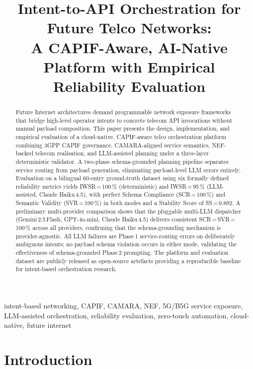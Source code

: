\documentclass[conference]{IEEEtran}
\title{Intent-to-API Orchestration for Future Telco Networks:\\
A CAPIF-Aware, AI-Native Platform with Empirical\\
Reliability Evaluation}
\author{
\IEEEauthorblockN{T\"{u}rkan Do\u{g}a Durak}
\IEEEauthorblockA{
Centre Tecnol\`{o}gic de Telecomunicacions de Catalunya (CTTC)\\
Castelldefels, Spain\\
\texttt{turkandoga.durak@cttc.es}
}
}
\begin{document}
\maketitle

\begin{abstract}
Future Internet architectures demand programmable network exposure
frameworks that bridge high-level operator intents to concrete telecom API
invocations without manual payload composition. This paper presents
the design, implementation, and empirical evaluation of a cloud-native,
CAPIF-aware telco orchestration platform combining 3GPP CAPIF governance,
CAMARA-aligned service semantics, NEF-backed telecom realisation, and
LLM-assisted planning under a three-layer deterministic validator.
A two-phase schema-grounded planning pipeline separates service routing
from payload generation, eliminating payload-level LLM errors entirely.
Evaluation on a bilingual 60-entry ground-truth dataset using six formally
defined reliability metrics yields IWSR\,=\,100\,\% (deterministic) and
IWSR\,=\,95\,\% (LLM-assisted, Claude Haiku\,4.5), with perfect Schema
Compliance (SCR\,=\,100\,\%) and Semantic Validity (SVR\,=\,100\,\%)
in both modes and a Stability Score of SS\,=\,0.892.
A preliminary multi-provider comparison shows that the pluggable
multi-LLM dispatcher (Gemini\,2.5\,Flash, GPT-4o-mini, Claude Haiku\,4.5)
delivers consistent SCR\,=\,SVR\,=\,100\,\% across all providers,
confirming that the schema-grounding mechanism is provider-agnostic.
All LLM failures are Phase\,1 service-routing errors on deliberately
ambiguous intents; no payload schema violation occurs in either mode,
validating the effectiveness of schema-grounded Phase\,2 prompting.
The platform and evaluation dataset are publicly released as open-source
artefacts providing a reproducible baseline for intent-based orchestration
research.
\end{abstract}

\begin{IEEEkeywords}
intent-based networking, CAPIF, CAMARA, NEF, 5G/B5G service exposure,
LLM-assisted orchestration, reliability evaluation, zero-touch automation,
cloud-native, future internet
\end{IEEEkeywords}

\section{Introduction}
\end{document}
